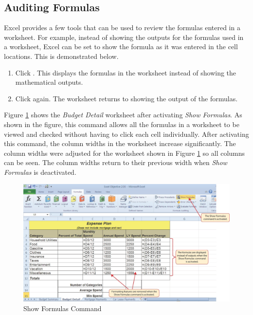 \subsection{Auditing Formulas}

Excel provides a few tools that can be used to review the formulas entered in a worksheet. For example, instead of showing the outputs for the formulas used in a worksheet, Excel can be set to show the formula as it was entered in the cell locations. This is demonstrated below.

\begin{enumerate}
	\item Click . This displays the formulas in the worksheet instead of showing the mathematical outputs.
	\item Click  again. The worksheet returns to showing the output of the formulas.
\end{enumerate}

Figure \ref{02:fig08} shows the \textit{Budget Detail} worksheet after activating \textit{Show Formulas}. As shown in the figure, this command allows all the formulas in a worksheet to be viewed and checked without having to click each cell individually. After activating this command, the column widths in the worksheet increase significantly. The column widths were adjusted for the worksheet shown in Figure \ref{02:fig08} so all columns can be seen. The column widths return to their previous width when \textit{Show Formulas} is deactivated.

\begin{figure}[H]
	\centering
	\includegraphics[width=\maxwidth{.95\linewidth}]{gfx/ch02_fig08}
	\caption{Show Formulas Command}
	\label{02:fig08}
\end{figure}

